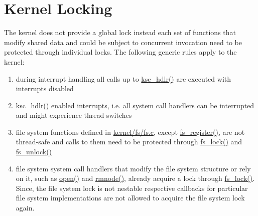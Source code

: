 %
%
%



\section{Kernel Locking}

The kernel does not provide a global lock instead each set of functions that modify shared data and could be subject to concurrent invocation need to be protected through individual locks. The following generic rules apply to the kernel:
\begin{enumerate}
	\item during interrupt handling all calls up to \hyperref[kernel_2syscall_8c_a7af5fd6fbe3d25d1a6c23a7cfb8c5822]{ksc\_hdlr()} are executed with interrupts disabled
	\item \hyperref[kernel_2syscall_8c_a7af5fd6fbe3d25d1a6c23a7cfb8c5822]{ksc\_hdlr()} enabled interrupts, i.e. all system call handlers can be interrupted and might experience thread switches
	\item file system functions defined in \hyperref[fs_8c]{kernel/fs/fs.c}, except \hyperref[fs_8c_a11ce2a4ca94ef9167c296a3788c466a5]{fs\_register()}, are not thread-safe and calls to them need to be protected through \hyperref[fs_8c_a5d8afec6e07924b790d1de8c4b5e416a]{fs\_lock()} and \hyperref[fs_8c_a6becda9de89bcff22da1b19436174d13]{fs\_unlock()}
	\item file system system call handlers that modify the file system structure or rely on it, such as \hyperref[structfs__ops__t_a0ea05ccab180719ed0f32631d5ad71bf]{open()} and \hyperref[structfs__ops__t_a98fe7490086237888a48187e06214cc6]{rmnode()}, already acquire a lock through \hyperref[fs_8c_a5d8afec6e07924b790d1de8c4b5e416a]{fs\_lock()}. Since, the file system lock is not nestable respective callbacks for particular file system implementations are not allowed to acquire the file system lock again.
\end{enumerate}
